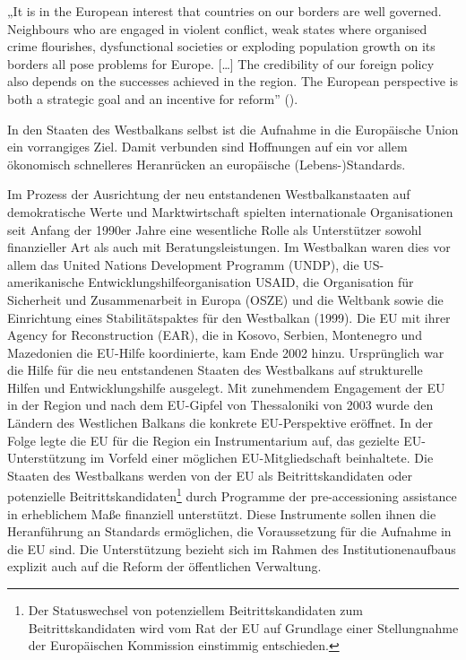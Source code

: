 „It is in the European interest that countries on our borders are well governed. Neighbours who are engaged in violent conflict, weak states where organised crime flourishes, dysfunctional societies or exploding population growth on its borders all pose problems for Europe. […] The credibility of our foreign policy also depends on the successes achieved in the region. The European perspective is both a strategic goal and an incentive for reform” (\cite{solana}).\par

In den Staaten des Westbalkans selbst ist die Aufnahme in die Europäische Union ein vorrangiges Ziel. Damit verbunden sind Hoffnungen auf ein vor allem ökonomisch schnelleres Heranrücken an europäische (Lebens-)Standards.\par

Im Prozess der Ausrichtung der neu entstandenen Westbalkanstaaten auf demokratische Werte und Marktwirtschaft spielten internationale Organisationen seit Anfang der 1990er Jahre eine wesentliche Rolle als Unterstützer sowohl finanzieller Art als auch mit Beratungsleistungen. Im Westbalkan waren dies vor allem das United Nations Development Programm (UNDP), die US-amerikanische Entwicklungshilfeorganisation USAID, die Organisation für Sicherheit und Zusammenarbeit in Europa (OSZE) und die Weltbank sowie die Einrichtung eines Stabilitätspaktes für den Westbalkan (1999). Die EU mit ihrer Agency for Reconstruction (EAR), die in Kosovo, Serbien, Montenegro und Mazedonien die EU-Hilfe koordinierte, kam Ende 2002 hinzu. Ursprünglich war die Hilfe für die neu entstandenen Staaten des Westbalkans auf strukturelle Hilfen und Entwicklungshilfe ausgelegt. Mit zunehmendem Engagement der EU in der Region und nach dem EU-Gipfel von Thessaloniki von 2003 wurde den Ländern des Westlichen Balkans die konkrete EU-Perspektive eröffnet. In der Folge legte die EU für die Region ein Instrumentarium auf, das gezielte EU-Unterstützung im Vorfeld einer möglichen EU-Mitgliedschaft beinhaltete. Die Staaten des Westbalkans werden von der EU als Beitrittskandidaten oder potenzielle Beitrittskandidaten\footnote{Der Statuswechsel von potenziellem Beitrittskandidaten zum Beitrittskandidaten wird vom Rat der EU auf Grundlage einer Stellungnahme der Europäischen Kommission einstimmig entschieden.} durch Programme der pre-accessioning assistance in erheblichem Maße finanziell unterstützt. Diese Instrumente sollen ihnen die Heranführung an Standards ermöglichen, die Voraussetzung für die Aufnahme in die EU sind. Die Unterstützung bezieht sich im Rahmen des Institutionenaufbaus explizit auch auf die Reform der öffentlichen Verwaltung.
